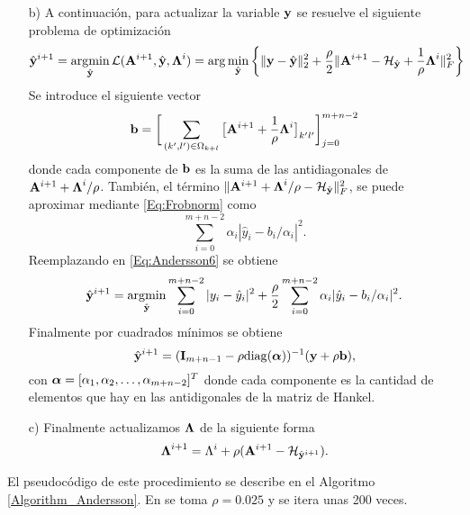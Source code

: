 \begin{itemize}
		\item[b)] A continuación, para actualizar la variable $\mathbf{y}$ se resuelve el siguiente problema de optimización
			\begin{equation}
				\hat{\mathbf{y}}^{i+1} = \operatorname*{\arg\!\min}_{\hat{\mathbf{y}}} \mathcal{L}(\mathbf{A}^{i+1},\hat{\mathbf{y}},\boldsymbol{\Lambda}^i) = \arg\min_{\hat{\mathbf{y}}} \bigg\{\|\mathbf{y} - \hat{\mathbf{y}}\|_2^2 + \frac{\rho}{2}\|\mathbf{A}^{i+1} - \mathcal{H}_{\hat{\mathbf{y}}}+\frac{1}{\rho}\boldsymbol{\Lambda}^i\|_F^2\bigg\}
				\label{Eq:Andersson6}
			\end{equation}
			Se introduce el siguiente vector
			\begin{equation}
				\mathbf{b} = \bigg[\sum_{(k',l')\in\Omega_{k+l}}\big[\mathbf{A}^{i+1}+\frac{1}{\rho}\boldsymbol{\Lambda}^{i}\big]_{k'l'}\bigg]_{j=0}^{m+n-2}
			\end{equation}
			donde cada componente de $\mathbf{b}$ es la suma de las antidiagonales de $\mathbf{A}^{i+1}+\boldsymbol{\Lambda}^{i}/\rho$. También, el término $\|\mathbf{A}^{i+1}+\boldsymbol{\Lambda}^{i}/\rho - \mathcal{H}_{\hat{\mathbf{y}}}\|_F^2$, se puede aproximar mediante \eqref{Eq:Frobnorm} como
			\[\sum_{i=0}^{m+n-2}\alpha_i|\hat{y}_i-b_i/\alpha_i|^2.\]
			Reemplazando en \eqref{Eq:Andersson6} se obtiene
			\begin{equation}
				\hat{\mathbf{y}}^{i+1} = \operatorname*{\arg\!\min}_{\hat{\mathbf{y}}}\sum_{i=0}^{m+n-2}|y_i-\hat{y}_i|^2 + \frac{\rho}{2}\sum_{i=0}^{m+n-2}\alpha_i|\hat{y}_i-b_i/\alpha_i|^2.
			\end{equation}
			Finalmente por cuadrados mínimos se obtiene
			\begin{equation}
				\hat{\mathbf{y}}^{i+1} = (\mathbf{I}_{m+n-1}-\rho\mathrm{diag}(\boldsymbol{\alpha}))^{-1}(\mathbf{y} + \rho\mathbf{b}),
			\end{equation}
			con $\boldsymbol{\alpha} = [\alpha_1,\alpha_2,\ldots,\alpha_{m+n-2}]^T$ donde cada componente es la cantidad de elementos que hay en las antidigonales de la matriz de Hankel.
	
			\item[c)] Finalmente actualizamos $\boldsymbol{\Lambda}$ de la siguiente forma
				\begin{equation}
					\boldsymbol{\Lambda}^{i+1} = \Lambda^i + \rho(\mathbf{A}^{i+1}-\mathcal{H}_{\hat{\mathbf{y}}^{i+1}}).
					\label{Eq:Andersson7}
				\end{equation}
		\end{itemize}

		El pseudocódigo de este procedimiento se describe en el Algoritmo \eqref{Algorithm_Andersson}. En \cite{Andersson2014} se toma $\rho = 0.025$ y se itera unas 200 veces. 

